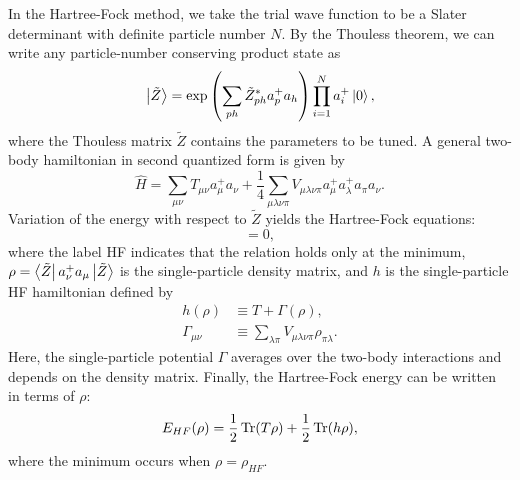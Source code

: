 \documentclass[prb,aps,twocolumn,showpacs,10pt]{revtex4-2}
\begin{document}
In the Hartree-Fock method, we take the trial wave function to be a Slater determinant with definite particle number $N$. By the Thouless theorem, we can write any particle-number conserving product state as 
\begin{equation}
\ket{\tilde{Z}} = \exp \left( \sum_{ph} \tilde{Z}_{ph}^* a_p^+ a_h \right)  \prod_{i=1}^N a_i^+ \ket{0},
\end{equation}
where the Thouless matrix $\tilde{Z}$ contains the parameters to be tuned. A general two-body hamiltonian in second quantized form is given by 
\begin{equation}
\hat{H} = \sum_{\mu \nu} T_{\mu \nu} a_{\mu}^+ a_{\nu} + \frac{1}{4} \sum_{\mu \lambda \nu \pi} V_{\mu \lambda \nu \pi } a_\mu^+ a_\lambda^+ a_\pi a_\nu.
\end{equation}
Variation of the energy with respect to $\tilde{Z}$ yields the Hartree-Fock equations:
\begin{equation}
[h(\rho_{HF}), \rho_{HF}]=0,
\end{equation}
where the label HF indicates that the relation holds only at the minimum, $\rho=\bra{\tilde{Z}} a_\nu^+ a_\mu \ket{\tilde{Z}}$ is the single-particle density matrix, and $h$ is the single-particle HF hamiltonian defined by
\begin{align}
h(\rho) &\equiv T + \Gamma(\rho), \\
\Gamma_{\mu \nu} &\equiv \sum_{\lambda \pi } V_{\mu \lambda \nu \pi } \rho_{\pi \lambda}.
\end{align}
Here, the single-particle potential $\Gamma$ averages over the two-body interactions and depends on the density matrix. Finally, the Hartree-Fock energy can be written in terms of $\rho$:
\begin{equation}
E_{HF}(\rho) = \frac{1}{2} \Tr (T\rho) + \frac{1}{2} \Tr (h \rho),
\end{equation}
where the minimum occurs when $\rho=\rho_{HF}$. \\
\end{document}

